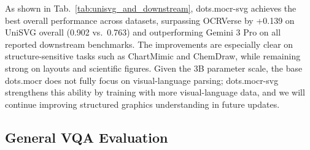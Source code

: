 \documentclass{article}
\begin{document}
\begin{table}[h]
\centering
\caption{ISVGEN reconstruction scores on UniSVG (low-level, high-level, overall) and downstream visual-language benchmarks (higher is better).}
\label{tab:unisvg_and_downstream}
\end{table}

As shown in Tab.~\ref{tab:unisvg_and_downstream}, dots.mocr-svg achieves the best overall performance across datasets, surpassing OCRVerse by +0.139 on UniSVG overall (0.902 vs.\ 0.763) and outperforming Gemini 3 Pro on all reported downstream benchmarks. The improvements are especially clear on structure-sensitive tasks such as ChartMimic and ChemDraw, while remaining strong on layouts and scientific figures. Given the 3B parameter scale, the base dots.mocr does not fully focus on visual-language parsing; dots.mocr-svg strengthens this ability by training with more visual-language data, and we will continue improving structured graphics understanding in future updates.

\subsection{General VQA Evaluation}
\end{document}
